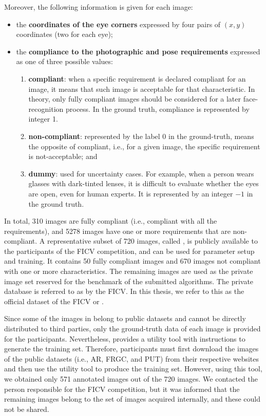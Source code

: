 Moreover, the following information is given for each image:
 
\begin{itemize}
\item the \textbf{coordinates of the eye corners} expressed by four pairs of $(x, y)$ coordinates (two for each eye);
\item the \textbf{compliance to the photographic and pose requirements} expressed as one of three possible values: 
 \begin{enumerate}[i]
 \item \textbf{compliant}: when a specific requirement is declared compliant for an image, it means that such image is acceptable for that characteristic. In theory, only fully compliant images should be considered for a later face-recognition process. In the ground truth, compliance is represented by integer 1.
 \item \textbf{non-compliant}: represented by the label 0 in the ground-truth, means the opposite of compliant, i.e., for a given image, the specific requirement is not-acceptable; and
 \item \textbf{dummy}: used for uncertainty cases. For example, when a person wears glasses with dark-tinted lenses, it is difficult to evaluate whether the eyes are open, even for human experts. It is represented by an integer $-1$ in the ground truth.
 \end{enumerate}
\end{itemize}
 
In total, 310 images are fully compliant (i.e., compliant with all the requirements), and 5278 images have one or more requirements that are non-compliant. A representative subset of 720 images, called \ficvtest, is publicly available to the participants of the FICV competition, and can be used for parameter setup and training. It contains 50 fully compliant images and 670 images not compliant with one or more characteristics. The remaining images are used as the private image set reserved for the benchmark of the submitted algorithms. The private database is referred to as \ficvofficial by the FICV. In this thesis, we refer to this as the official dataset of the FICV or \fvcongoing. 
 
Since some of the images in \ficvtest belong to public datasets and cannot be directly distributed to third parties, only the ground-truth data of each image is provided for the participants. Nevertheless, \fvcongoing provides a utility tool with instructions to generate the training set. Therefore, participants must first download the images of the public datasets (i.e., AR, FRGC, and PUT) from their respective websites and then use the utility tool to produce the training set. However, using this tool, we obtained only 571 annotated images out of the 720 images. We contacted the person responsible for the FICV competition, but it was informed that the remaining images belong to the set of images acquired internally, and these could not be shared.
 
